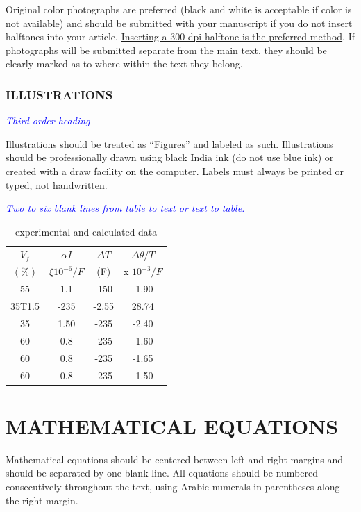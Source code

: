 \documentclass[]{asc}
\begin{document}
Original color photographs are preferred (black and white is acceptable if color is not available) and should be submitted with your manuscript if you do not insert halftones into your article. \underline{Inserting a 300 dpi halftone is the preferred method}. If photographs will be submitted separate from the main text, they should be clearly marked as to where within the text they belong.

\subsubsection*{ILLUSTRATIONS} 

\textcolor{blue}{\it Third-order heading}

Illustrations should be treated as ``Figures'' and labeled as such. Illustrations should be professionally drawn using black India ink (do not use blue ink) or created with a draw facility on the computer. Labels must always be printed or typed, not handwritten.

\textcolor{blue}{\it Two to six blank lines from table to text or text to table.}
\newline
\newline 
\begin{table}[t]
	\centering
	\caption{experimental and calculated data}
	\begin{tabular}{|cccc|}
		\hline
		$V_{f}$ & $\alpha I$ & $\Delta T$ & $\Delta \theta/T$\\ 
	    $(\%)$ & $\xi 10^{-6}/F$ & (F)& x $10^{-3}/F$\\
		\hline
		55 &  1.1 & -150 &  -1.90\\
		35T1.5 & -235 & -2.55 &  28.74\\
		35 & 1.50&-235&-2.40\\
		60 &  0.8&-235&-1.60\\
		60 & 0.8&-235&-1.65\\
	    60 & 0.8 &-235&-1.50\\
		\hline
	\end{tabular}
	\label{ta.ExampleTable}
\end{table}

\section*{MATHEMATICAL EQUATIONS} 
Mathematical equations should be centered between left and right margins and should be separated by one blank line. All equations should be numbered consecutively throughout the text, using Arabic numerals in parentheses along the right margin.
\end{document}

